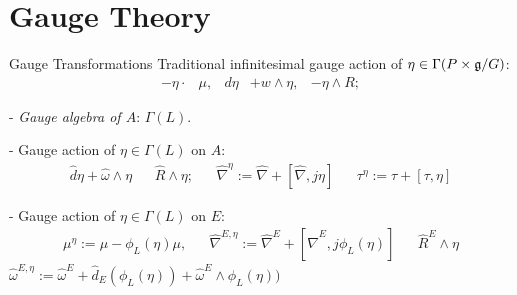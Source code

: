 \section{Gauge Theory}

\begin{frame}{Gauge Transformations}
    Traditional infinitesimal gauge action of $\eta  \in \Gamma(P \times \mathfrak{g}/G)$:
    \begin{align*}
        -\eta \cdot & \mu, &
        d\eta &+ w \wedge \eta, &
        - \eta \wedge  R;
    \end{align*}
    
    - \emph{Gauge algebra of $A$}: $\Gamma(L)$.
    
    - Gauge action of $\eta \in \Gamma(L)$ on $A$:
    \begin{align}
        \hat d \eta + \hat \omega \wedge \eta && 
        \hat R \wedge \eta; &&
        \hat \nabla^\eta := \hat \nabla + [\hat \nabla, j\eta]&&
        \tau^\eta := \tau + [\tau, \eta]
    \end{align}
    
    - Gauge action of $\eta \in \Gamma(L)$ on $E$:
    \begin{align}
        \mu^\eta := \mu - \phi_L(\eta)\mu, && \hat \nabla^{E, \eta} := \hat \nabla^E + [\hat \nabla^E, j\phi_L(\eta)] && \hat R^E \wedge \eta
    \end{align}
    $
        \hat \omega^{E, \eta} := \hat \omega^E + \hat d_E(\phi_L(\eta)) + \hat \omega^E \wedge \phi_L(\eta))
    $
    
\end{frame}



